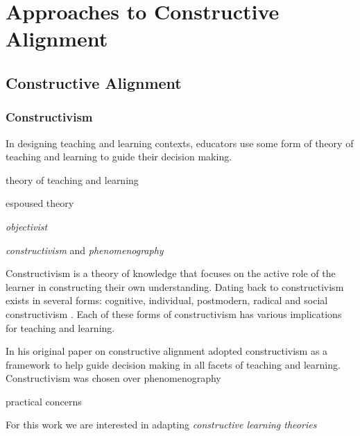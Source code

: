 
\chapter{Approaches to Constructive Alignment} %
\label{cha:background}

\section{Constructive Alignment} %
\label{sec:constructive_alignment}

\subsection{Constructivism} %
\label{sub:constructivism}

In designing teaching and learning contexts, educators use some form of theory of teaching and learning to guide their decision making.

theory of teaching and learning

espoused theory \cite{Argyris:1976}

\emph{objectivist}

\emph{constructivism} and \emph{phenomenography}


\cite{Cunningham:1996} 




\cite{Montessori:1946}

Constructivism is a theory of knowledge that focuses on the active role of the learner in constructing their own understanding. Dating back to \citet{Piaget:1950} constructivism exists in several forms: cognitive, individual, postmodern, radical and social constructivism \cite{Phillips:1995,Steffe:1995}. Each of these forms of constructivism has various implications for teaching and learning.









In his original paper on constructive alignment \citet{Biggs:1996c} adopted constructivism as a framework to help guide decision making in all facets of teaching and learning. Constructivism was chosen over phenomenography 

practical concerns


For this work we are interested in adapting \emph{constructive learning theories}

